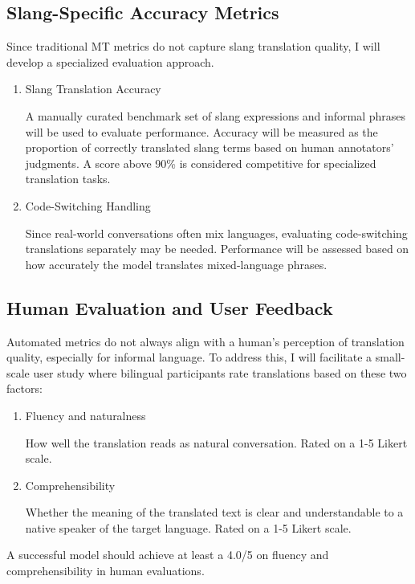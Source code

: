 \documentclass[10pt,twocolumn]{article}
\begin{document}
\subsection{Slang-Specific Accuracy Metrics}

Since traditional MT metrics do not capture slang translation quality, I will develop a specialized evaluation approach.

\begin{enumerate}
    \item Slang Translation Accuracy

A manually curated benchmark set of slang expressions and informal phrases will be used to evaluate performance. Accuracy will be measured as the proportion of correctly translated slang terms based on human annotators’ judgments. A score above 90\% is considered competitive for specialized translation tasks. 

    \item Code-Switching Handling

Since real-world conversations often mix languages, evaluating code-switching translations separately may be needed. Performance will be assessed based on how accurately the model translates mixed-language phrases.

\end{enumerate}

\subsection{Human Evaluation and User Feedback}

Automated metrics do not always align with a human’s perception of translation quality, especially for informal language. To address this, I will facilitate a small-scale user study where bilingual participants rate translations based on these two factors:

\begin{enumerate}
    \item Fluency and naturalness

How well the translation reads as natural conversation. Rated on a 1-5 Likert scale.

    \item Comprehensibility

Whether the meaning of the translated text is clear and understandable to a native speaker of the target language. Rated on a 1-5 Likert scale.

\end{enumerate}
A successful model should achieve at least a 4.0/5 on fluency and comprehensibility in human evaluations.

\printbibliography

\appendix

\clearpage

\onecolumn
\end{document}
